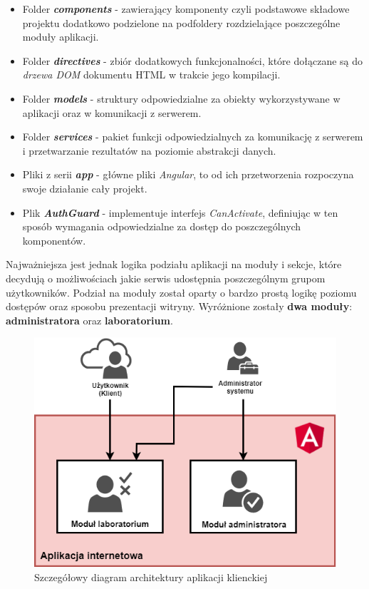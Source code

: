     \begin{itemize}

        \item Folder \textit{\textbf{components}} - zawierający komponenty czyli podstawowe składowe projektu dodatkowo podzielone na podfoldery rozdzielające poszczególne moduły aplikacji.
        \item Folder \textit{\textbf{directives}} - zbiór dodatkowych funkcjonalności, które dołączane są do \textit{drzewa DOM} dokumentu HTML w trakcie jego kompilacji.
        \item Folder \textit{\textbf{models}} - struktury odpowiedzialne za obiekty wykorzystywane w aplikacji oraz w komunikacji z serwerem.
        \item Folder \textit{\textbf{services}} - pakiet funkcji odpowiedzialnych za komunikację z serwerem i przetwarzanie rezultatów na poziomie abstrakcji danych.
        \item Pliki z serii \textit{\textbf{app}} - główne pliki \textit{Angular}, to od ich przetworzenia rozpoczyna swoje działanie cały projekt.
        \item Plik \textbf{\textit{AuthGuard}} - implementuje interfejs \textit{CanActivate}, definiując w ten sposób wymagania odpowiedzialne za dostęp do poszczególnych komponentów.
    \end{itemize}
Najważniejsza jest jednak logika podziału aplikacji na moduły i sekcje, które decydują o możliwościach jakie serwis udostępnia poszczególnym grupom użytkowników. Podział na moduły został oparty o bardzo prostą logikę poziomu dostępów oraz sposobu prezentacji witryny. Wyróżnione zostały \textbf{dwa moduły}: \textbf{administratora} oraz \textbf{laboratorium}.
\begin{figure}[ht]
	\centering
	\includegraphics[width=0.75\linewidth]{graphics/chapter-4/client-architecture.png}
	\caption{Szczegółowy diagram architektury aplikacji klienckiej}
	\label{fig:client-architecture}
\end{figure}
